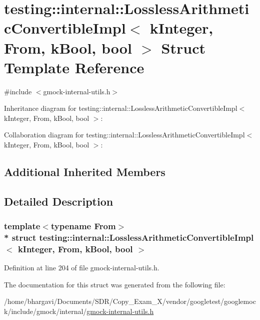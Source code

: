 \hypertarget{structtesting_1_1internal_1_1_lossless_arithmetic_convertible_impl_3_01k_integer_00_01_from_00_01k_bool_00_01bool_01_4}{}\section{testing\+:\+:internal\+:\+:Lossless\+Arithmetic\+Convertible\+Impl$<$ k\+Integer, From, k\+Bool, bool $>$ Struct Template Reference}
\label{structtesting_1_1internal_1_1_lossless_arithmetic_convertible_impl_3_01k_integer_00_01_from_00_01k_bool_00_01bool_01_4}


{\ttfamily \#include $<$gmock-\/internal-\/utils.\+h$>$}



Inheritance diagram for testing\+:\+:internal\+:\+:Lossless\+Arithmetic\+Convertible\+Impl$<$ k\+Integer, From, k\+Bool, bool $>$\+:


Collaboration diagram for testing\+:\+:internal\+:\+:Lossless\+Arithmetic\+Convertible\+Impl$<$ k\+Integer, From, k\+Bool, bool $>$\+:
\subsection*{Additional Inherited Members}


\subsection{Detailed Description}
\subsubsection*{template$<$typename From$>$\\*
struct testing\+::internal\+::\+Lossless\+Arithmetic\+Convertible\+Impl$<$ k\+Integer, From, k\+Bool, bool $>$}



Definition at line 204 of file gmock-\/internal-\/utils.\+h.



The documentation for this struct was generated from the following file\+:\begin{DoxyCompactItemize}
\item 
/home/bhargavi/\+Documents/\+S\+D\+R/\+Copy\+\_\+\+Exam\+\_\+X/vendor/googletest/googlemock/include/gmock/internal/\hyperlink{gmock-internal-utils_8h}{gmock-\/internal-\/utils.\+h}\end{DoxyCompactItemize}
